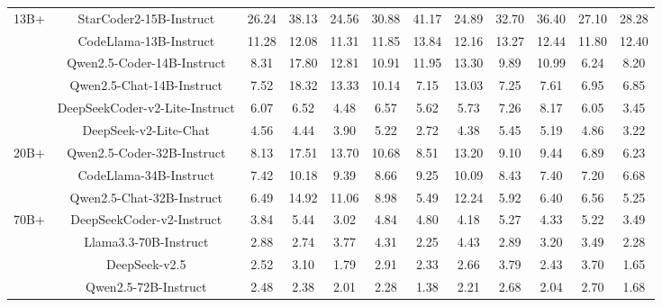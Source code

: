 \documentclass[11pt, a4paper, logo, copyright, nonumbering, amsart]{map}
\begin{document}
\begin{CJK*}{UTF8}{gbsn}
\begin{table*}[h!]
\begin{adjustbox}{width=\textwidth}
\begin{tabular}{c|c|cccccccccc}
    \midrule
    \multirow{6}{*}{13B+} 
    & StarCoder2-15B-Instruct & 26.24 & 38.13 & 24.56 & 30.88 & 41.17 & 24.89 & 32.70 & 36.40 & 27.10 & 28.28 \\
    & CodeLlama-13B-Instruct & 11.28 & 12.08 & 11.31 & 11.85 & 13.84 & 12.16 & 13.27 & 12.44 & 11.80 & 12.40 \\ 
    & Qwen2.5-Coder-14B-Instruct & 8.31 & 17.80 & 12.81 & 10.91 & 11.95 & 13.30 & 9.89 & 10.99 & 6.24 & 8.20 \\
    & Qwen2.5-Chat-14B-Instruct & 7.52 & 18.32 & 13.33 & 10.14 & 7.15 & 13.03 & 7.25 & 7.61 & 6.95 & 6.85 \\
    & DeepSeekCoder-v2-Lite-Instruct & 6.07 & 6.52 & 4.48 & 6.57 & 5.62 & 5.73 & 7.26 & 8.17 & 6.05 & 3.45 \\
    & DeepSeek-v2-Lite-Chat & 4.56 & 4.44 & 3.90 & 5.22 & 2.72 & 4.38 & 5.45 & 5.19 & 4.86 & 3.22 \\
    
    \midrule
    \multirow{3}{*}{20B+} 
    & Qwen2.5-Coder-32B-Instruct & 8.13 & 17.51 & 13.70 & 10.68 & 8.51 & 13.20 & 9.10 & 9.44 & 6.89 & 6.23 \\
    & CodeLlama-34B-Instruct & 7.42 & 10.18 & 9.39 & 8.66 & 9.25 & 10.09 & 8.43 & 7.40 & 7.20 & 6.68 \\
    & Qwen2.5-Chat-32B-Instruct & 6.49 & 14.92 & 11.06 & 8.98 & 5.49 & 12.24 & 5.92 & 6.40 & 6.56 & 5.25 \\
    
    \midrule
    \multirow{4}{*}{70B+} 
    & DeepSeekCoder-v2-Instruct & 3.84 & 5.44 & 3.02 & 4.84 & 4.80 & 4.18 & 5.27 & 4.33 & 5.22 & 3.49 \\
    & Llama3.3-70B-Instruct & 2.88 & 2.74 & 3.77 & 4.31 & 2.25 & 4.43 & 2.89 & 3.20 & 3.49 & 2.28 \\
    & DeepSeek-v2.5 & 2.52 & 3.10 & 1.79 & 2.91 & 2.33 & 2.66 & 3.79 & 2.43 & 3.70 & 1.65 \\
    & Qwen2.5-72B-Instruct & 2.48 & 2.38 & 2.01 & 2.28 & 1.38 & 2.21 & 2.68 & 2.04 & 2.70 & 1.68 \\
    

\end{tabular}
\end{adjustbox}
\end{table*}
\end{CJK*}
\end{document}
